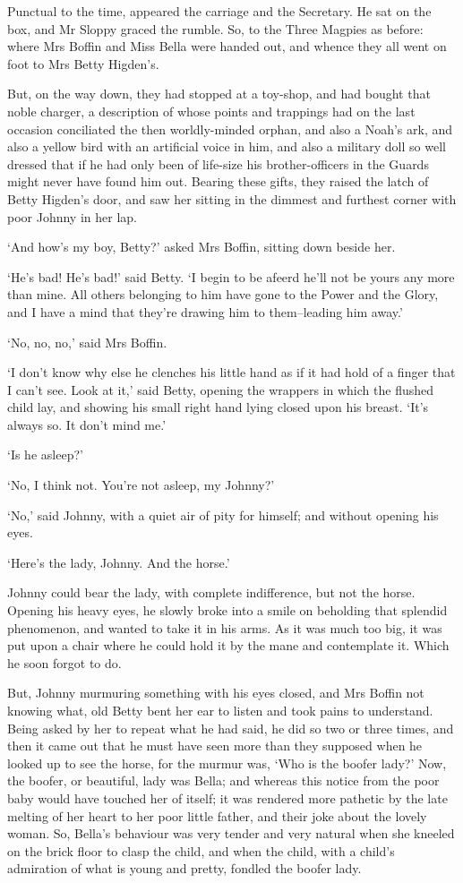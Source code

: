 Punctual to the time, appeared the carriage and the Secretary. He sat
on the box, and Mr Sloppy graced the rumble. So, to the Three Magpies as
before: where Mrs Boffin and Miss Bella were handed out, and whence they
all went on foot to Mrs Betty Higden’s.

But, on the way down, they had stopped at a toy-shop, and had bought
that noble charger, a description of whose points and trappings had on
the last occasion conciliated the then worldly-minded orphan, and also a
Noah’s ark, and also a yellow bird with an artificial voice in him,
and also a military doll so well dressed that if he had only been of
life-size his brother-officers in the Guards might never have found him
out. Bearing these gifts, they raised the latch of Betty Higden’s door,
and saw her sitting in the dimmest and furthest corner with poor Johnny
in her lap.

‘And how’s my boy, Betty?’ asked Mrs Boffin, sitting down beside her.

‘He’s bad! He’s bad!’ said Betty. ‘I begin to be afeerd he’ll not be
yours any more than mine. All others belonging to him have gone to
the Power and the Glory, and I have a mind that they’re drawing him to
them--leading him away.’

‘No, no, no,’ said Mrs Boffin.

‘I don’t know why else he clenches his little hand as if it had hold of
a finger that I can’t see. Look at it,’ said Betty, opening the wrappers
in which the flushed child lay, and showing his small right hand lying
closed upon his breast. ‘It’s always so. It don’t mind me.’

‘Is he asleep?’

‘No, I think not. You’re not asleep, my Johnny?’

‘No,’ said Johnny, with a quiet air of pity for himself; and without
opening his eyes.

‘Here’s the lady, Johnny. And the horse.’

Johnny could bear the lady, with complete indifference, but not the
horse. Opening his heavy eyes, he slowly broke into a smile on beholding
that splendid phenomenon, and wanted to take it in his arms. As it was
much too big, it was put upon a chair where he could hold it by the mane
and contemplate it. Which he soon forgot to do.

But, Johnny murmuring something with his eyes closed, and Mrs Boffin
not knowing what, old Betty bent her ear to listen and took pains to
understand. Being asked by her to repeat what he had said, he did so two
or three times, and then it came out that he must have seen more than
they supposed when he looked up to see the horse, for the murmur was,
‘Who is the boofer lady?’ Now, the boofer, or beautiful, lady was Bella;
and whereas this notice from the poor baby would have touched her of
itself; it was rendered more pathetic by the late melting of her heart
to her poor little father, and their joke about the lovely woman. So,
Bella’s behaviour was very tender and very natural when she kneeled on
the brick floor to clasp the child, and when the child, with a child’s
admiration of what is young and pretty, fondled the boofer lady.

